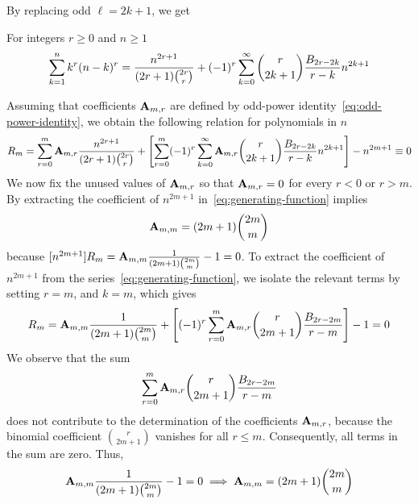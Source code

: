 By replacing odd $\ell = 2k+1$, we get
\begin{proposition}
    For integers $r \geq 0$ and $n \geq 1$
    \label{prop:bivariate-faulhabers-formula}
    \begin{align*}
        \sum_{k=1}^{n} k^{r} (n-k)^{r}
        = \frac{n^{2r+1}}{(2r+1) \binom{2r}r}
        + (-1)^r \sum_{k=0}^{\infty} \binom{r}{2k+1} \frac{{B}\sb{2r-2k}}{r-k} n^{2k+1}
    \end{align*}
\end{proposition}
Assuming that coefficients ${\mathbf{A}} \sb{m,r}$ are defined
by odd-power identity~\eqref{eq:odd-power-identity},
we obtain the following relation for polynomials in $n$
\begin{align}
    \label{eq:generating-function}
    R_{m} = \sum_{r=0}^{m} {\mathbf{A}} \sb{m,r} \frac{n^{2r+1}}{(2r+1) \binom{2r}{r}}
    + \left[ \sum_{r=0}^{m} (-1)^r \sum_{k=0}^{\infty} {\mathbf{A}} \sb{m,r} \binom{r}{2k+1} \frac{{B}\sb{2r-2k}}{r-k} n^{2k+1} \right]
    - n^{2m+1} \equiv 0
\end{align}
We now fix the unused values of ${\mathbf{A}} \sb{m,r}$ so that ${\mathbf{A}} \sb{m,r} = 0$ for every $r < 0$ or $r > m$.
By extracting the coefficient of $n^{2m+1}$ in~\eqref{eq:generating-function} implies
\begin{align*}
    {\mathbf{A}} \sb{m,m} = (2m+1)\binom{2m}{m}
\end{align*}
because $[n^{2m+1}]R_m = {\mathbf{A}} \sb{m,m} \frac{1}{(2m+1) \binom{2m}{m}} - 1 = 0$.
To extract the coefficient of $n^{2m+1}$ from the series~\eqref{eq:generating-function},
we isolate the relevant terms by setting $r = m$,
and $k = m$, which gives
\begin{align*}
[n^{2m+1}]
    R_{m}
    = \coeffA{m}{m} \frac{1}{(2m+1) \binom{2m}{m}}
    + \left[ (-1)^r \sum_{r=0}^{m} \coeffA{m}{r} \binom{r}{2m+1} \frac{\bernoulli{2r-2m}}{r-m} \right]
    - 1 = 0
\end{align*}
We observe that the sum
\begin{align*}
    \sum_{r=0}^{m} {\mathbf{A}} \sb{m,r} \binom{r}{2m+1} \frac{{B}\sb{2r-2m}}{r-m}
\end{align*}
does not contribute to the determination of the coefficients ${\mathbf{A}} \sb{m,r}$, because the binomial coefficient
$\binom{r}{2m+1}$ vanishes for all $r \leq m$.
Consequently, all terms in the sum are zero.
Thus,
\begin{align*}
    {\mathbf{A}} \sb{m,m} \frac{1}{(2m+1) \binom{2m}{m}}  - 1 = 0 \implies {\mathbf{A}} \sb{m,m} = (2m+1) \binom{2m}{m}
\end{align*}
